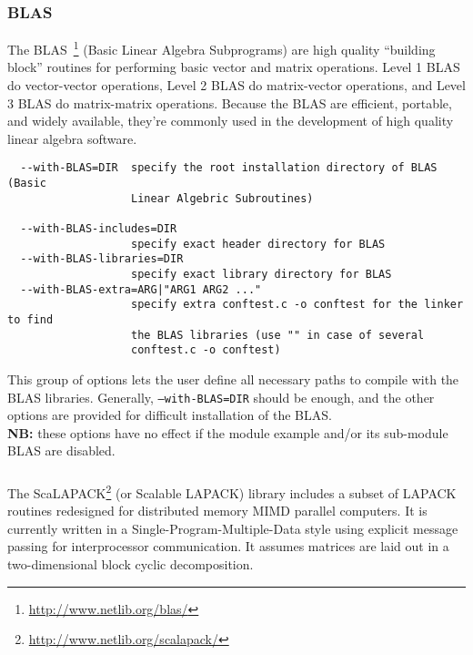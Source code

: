 \subsubsection{BLAS}

The BLAS~\footnote{\url{http://www.netlib.org/blas/}} (Basic Linear
Algebra Subprograms) are high quality ``building block'' routines for
performing basic vector and matrix operations.  Level 1 BLAS do
vector-vector operations, Level 2 BLAS do matrix-vector operations,
and Level 3 BLAS do matrix-matrix operations. Because the BLAS are
efficient, portable, and widely available, they're commonly used in
the development of high quality linear algebra software.

{\footnotesize
\begin{verbatim}
  --with-BLAS=DIR  specify the root installation directory of BLAS (Basic
                   Linear Algebric Subroutines)

  --with-BLAS-includes=DIR
                   specify exact header directory for BLAS
  --with-BLAS-libraries=DIR
                   specify exact library directory for BLAS
  --with-BLAS-extra=ARG|"ARG1 ARG2 ..."
                   specify extra conftest.c -o conftest for the linker to find
                   the BLAS libraries (use "" in case of several 
                   conftest.c -o conftest)
\end{verbatim}
}
\noindent This group of options lets the user define all necessary
paths to compile with the BLAS libraries. Generally,
\texttt{--with-BLAS=DIR} should be enough, and the other options are
provided for difficult installation of the BLAS.\\ \textbf{NB:} these
options have no effect if the module example and/or its sub-module
BLAS are disabled.

\subsubsection{\scalapack}

The ScaLAPACK\footnote{\url{http://www.netlib.org/scalapack/}} (or
Scalable LAPACK) library includes a subset of LAPACK routines
redesigned for distributed memory MIMD parallel computers. It is
currently written in a Single-Program-Multiple-Data style using
explicit message passing for interprocessor communication. It assumes
matrices are laid out in a two-dimensional block cyclic decomposition.

